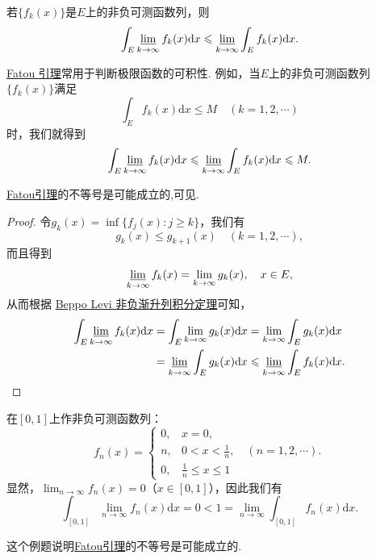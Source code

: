 \documentclass[../../main.tex]{subfiles}%
\begin{document}
\begin{theorem}[Fatou引理]\label{theorem:Fatou引理}
若\(\{f_k(x)\}\)是\(E\)上的非负可测函数列，则
\begin{align*}
\int_E \varliminf_{k \to \infty} f_k(x) \mathrm{d}x \leqslant \varliminf_{k \to \infty} \int_E f_k(x) \mathrm{d}x. 
\end{align*}
\end{theorem}
\begin{note}
\hyperref[theorem:Fatou引理]{Fatou 引理}常用于判断极限函数的可积性. 例如，当\(E\)上的非负可测函数列\(\{f_k(x)\}\)满足
\[
\int_E f_k(x) \mathrm{d}x \leqslant M \quad (k = 1, 2, \cdots)
\]
时，我们就得到
\[
\int_E \varliminf_{k \to \infty} f_k(x) \mathrm{d}x \leqslant \varliminf_{k \to \infty} \int_E f_k(x) \mathrm{d}x\leqslant M.
\] 
\end{note}
\begin{remark}
\hyperref[theorem:Fatou引理]{Fatou引理}的不等号是可能成立的,可见.
\end{remark}
\begin{proof}

令\(g_k(x) = \inf\{f_j(x): j \geqslant k\}\)，我们有
\[
g_k(x) \leqslant g_{k + 1}(x) \quad (k = 1, 2, \cdots),
\]
而且得到
\[
\varliminf_{k \to \infty} f_k(x) = \lim_{k \to \infty} g_k(x), \quad x \in E,
\]
从而根据 \hyperref[theorem:Beppo Levi非负渐升列积分定理]{Beppo Levi 非负渐升列积分定理}可知，
\begin{align*}
\int_E \varliminf_{k \to \infty} f_k(x) \mathrm{d}x &= \int_E \lim_{k \to \infty} g_k(x) \mathrm{d}x = \lim_{k \to \infty} \int_E g_k(x) \mathrm{d}x \\
&= \varliminf_{k \to \infty} \int_E g_k(x) \mathrm{d}x \leqslant \varliminf_{k \to \infty} \int_E f_k(x) \mathrm{d}x.
\end{align*}

\end{proof}

\begin{example}\label{example:Fatou引理不等号成立的例子}
在\([0, 1]\)上作非负可测函数列：
\[
f_n(x)=
\begin{cases}
0, & x = 0, \\
n, & 0 < x < \frac{1}{n}, \quad (n = 1, 2, \cdots). \\
0, & \frac{1}{n} \leqslant x \leqslant 1
\end{cases}
\]
显然，\(\lim_{n \to \infty} f_n(x) = 0\)（\(x \in [0, 1]\)），因此我们有
\[
\int_{[0, 1]} \lim_{n \to \infty} f_n(x) \mathrm{d}x = 0 < 1 = \lim_{n \to \infty} \int_{[0, 1]} f_n(x) \mathrm{d}x.
\] 
\end{example}
\begin{note}
这个例题说明\hyperref[theorem:Fatou引理]{Fatou引理}的不等号是可能成立的.
\end{note}
\end{document}
